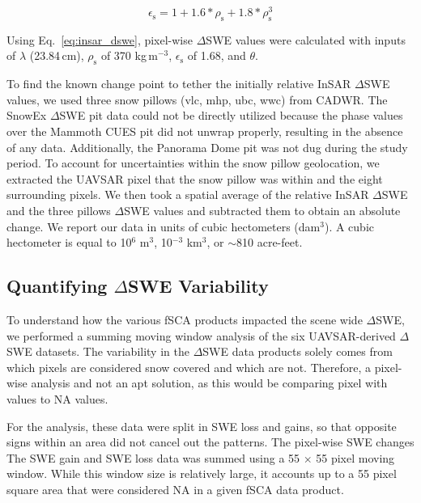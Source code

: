 \begin{equation}
\epsilon_\mathrm{s} = 1 + 1.6 * \rho_\mathrm{s} + 1.8 * \rho_\mathrm{s}^3
\label{eq:dens_to_perm}
\end{equation}


\noindent Using Eq.~\ref{eq:insar_dswe}, pixel-wise $\Delta$SWE values were calculated with inputs of $\lambda$ (23.84\,cm), $\rho_\mathrm{s}$ of 370 kg\,m$^{-3}$, $\epsilon_\mathrm{s}$ of 1.68, and $\theta$. 

To find the known change point to tether the initially relative InSAR $\Delta$SWE values, we used three snow pillows (vlc, mhp, ubc, wwc) from CADWR. The SnowEx $\Delta$SWE pit data could not be directly utilized because the phase values over the Mammoth CUES pit did not unwrap properly, resulting in the absence of any data. Additionally, the Panorama Dome pit was not dug during the study period. To account for uncertainties within the snow pillow geolocation, we extracted the UAVSAR pixel that the snow pillow was within and the eight surrounding pixels. We then took a spatial average of the relative InSAR $\Delta$SWE and the three pillows $\Delta$SWE values and subtracted them to obtain an absolute change. We report our data in units of cubic hectometers (dam$^{3}$). A cubic hectometer is equal to 10$^{6}$ m$^{3}$, 10$^{-3}$ km$^{3}$, or $\sim$810 acre-feet.

\hypertarget{ch4-methods-2}{\subsection{Quantifying $\Delta$SWE Variability}\label{ch4-methods-1}}


To understand how the various fSCA products impacted the scene wide $\Delta$SWE, we performed a summing moving window analysis of the six UAVSAR-derived $\Delta$SWE datasets. The variability in the $\Delta$SWE data products solely comes from which pixels are considered snow covered and which are not. Therefore, a pixel-wise analysis and not an apt solution, as this would be comparing pixel with values to NA values.

For the analysis, these data were split in SWE loss and gains, so that opposite signs within an area did not cancel out the patterns. The pixel-wise SWE changes The SWE gain and SWE loss data was summed using a 55 $\times$ 55 pixel moving window. While this window size is relatively large, it accounts up to a 55 pixel square area that were considered NA in a given fSCA data product.


